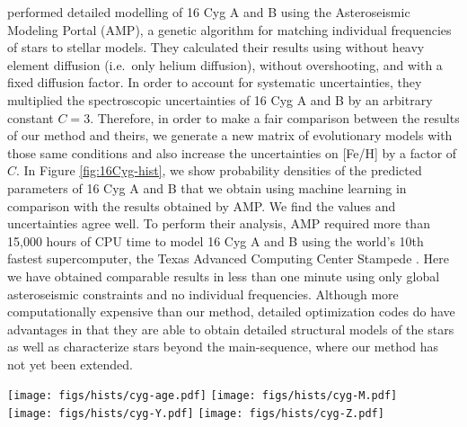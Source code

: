 \documentclass[twocolumn,twocolappendix]{aastex6}
\begin{document}
\citet{2015ApJ...811L..37M} performed detailed modelling of 16 Cyg A and B using the Asteroseismic Modeling Portal (AMP), a genetic algorithm for matching individual frequencies of stars to stellar models. They calculated their results using without heavy element diffusion (i.e.\ only helium diffusion), without overshooting, and with a fixed diffusion factor. In order to account for systematic uncertainties, they multiplied the spectroscopic uncertainties of 16 Cyg A and B by an arbitrary constant $C=3$. Therefore, in order to make a fair comparison between the results of our method and theirs, we generate a new matrix of evolutionary models with those same conditions and also increase the uncertainties on [Fe/H] by a factor of $C$. In Figure \ref{fig:16Cyg-hist}, we show probability densities of the predicted parameters of 16 Cyg A and B that we obtain using machine learning in comparison with the results obtained by AMP. We find the values and uncertainties agree well. To perform their analysis, AMP required more than 15,000 hours of CPU time to model 16 Cyg A and B using the world's 10th fastest supercomputer, the Texas Advanced Computing Center Stampede \citep{TOP500}. Here we have obtained comparable results in less than one minute using only global asteroseismic constraints and no individual frequencies. Although more computationally expensive than our method, detailed optimization codes do have advantages in that they are able to obtain detailed structural models of the stars as well as characterize stars beyond the main-sequence, where our method has not yet been extended. 

\begin{figure*}
    \centering
    \texttt{[image: figs/hists/cyg-age.pdf]}\hfill
    \texttt{[image: figs/hists/cyg-M.pdf]}\\
    \texttt{[image: figs/hists/cyg-Y.pdf]}\hfill
    \texttt{[image: figs/hists/cyg-Z.pdf]}
    \caption{Probability densities showing predictions from machine learning of fundamental stellar parameters for 16 Cyg A (red) and B (blue) against predictions from AMP modelling. Relative uncertainties are shown beside each plot. Predictions and $2\sigma$ uncertainties from AMP modelling are shown with arrows.}
    \label{fig:16Cyg-hist}
\end{figure*}
\end{document}
